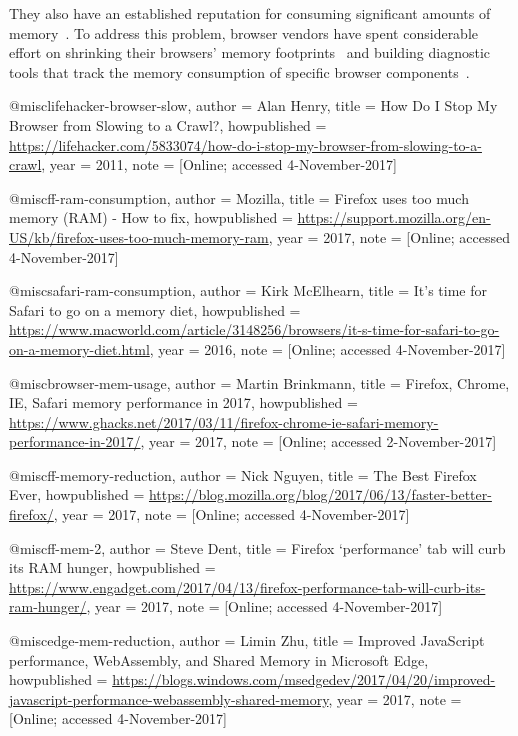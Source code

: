 They also have an established reputation for consuming significant
amounts of
memory~\cite{lifehacker-browser-slow,ff-ram-consumption,safari-ram-consumption}.
To address this problem, browser vendors have spent considerable
effort on shrinking their browsers' memory footprints~\cite{oilpan,
  ff-memory-reduction, edge-mem-reduction, safari-less-memory,
  ff-mem-2} and building diagnostic tools that track the memory
consumption of specific browser components~\cite{speed-up-gchrome,
  ff-about-memory}.


@misc{lifehacker-browser-slow,
  author = {Alan Henry},
  title = {{How Do I Stop My Browser from Slowing to a Crawl?}},
  howpublished = {\url{https://lifehacker.com/5833074/how-do-i-stop-my-browser-from-slowing-to-a-crawl}},
  year = {2011},
  note = {[Online; accessed 4-November-2017]}
}

@misc{ff-ram-consumption,
  author = {Mozilla},
  title = {{Firefox uses too much memory (RAM) - How to fix}},
  howpublished = {\url{https://support.mozilla.org/en-US/kb/firefox-uses-too-much-memory-ram}},
  year = {2017},
  note = {[Online; accessed 4-November-2017]}
}  

@misc{safari-ram-consumption,
  author = {Kirk McElhearn},
  title = {{It's time for Safari to go on a memory diet}},
  howpublished = {\url{https://www.macworld.com/article/3148256/browsers/it-s-time-for-safari-to-go-on-a-memory-diet.html}},
  year = {2016},
  note = {[Online; accessed 4-November-2017]}
} 


@misc{browser-mem-usage,
  author = {Martin Brinkmann},
  title = {{Firefox, Chrome, IE, Safari memory performance in 2017}},
  howpublished = {\url{https://www.ghacks.net/2017/03/11/firefox-chrome-ie-safari-memory-performance-in-2017/}},
  year = {2017},
  note = {[Online; accessed 2-November-2017]}
}


@misc{ff-memory-reduction,
        author = {Nick Nguyen},
        title = {{The Best Firefox Ever}},
        howpublished = {\url{https://blog.mozilla.org/blog/2017/06/13/faster-better-firefox/}},
        year = {2017},
        note = {[Online; accessed 4-November-2017]}
      }

      @misc{ff-mem-2,
        author = {Steve Dent},
        title = {{Firefox `performance' tab will curb its RAM hunger}},
        howpublished = {\url{https://www.engadget.com/2017/04/13/firefox-performance-tab-will-curb-its-ram-hunger/}},
        year = {2017},
        note = {[Online; accessed 4-November-2017]}
      }

      @misc{edge-mem-reduction,
        author = {Limin Zhu},
        title = {{Improved JavaScript performance, WebAssembly, and Shared Memory in Microsoft Edge}},
        howpublished = {\url{https://blogs.windows.com/msedgedev/2017/04/20/improved-javascript-performance-webassembly-shared-memory}},
        year = {2017},
        note = {[Online; accessed 4-November-2017]}
      }

